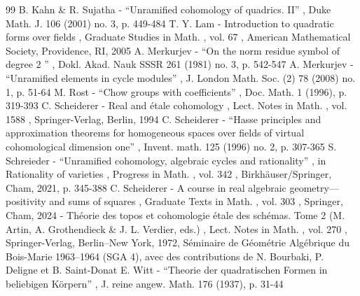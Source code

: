 \documentclass[11pt]{article}
\theoremstyle{definition}
\begin{document}
\begin{thebibliography}{99}
 B. Kahn \& R. Sujatha - “Unramified cohomology of quadrics. II” , Duke Math. J. 106 (2001) no. 3, p. 449-484
 T. Y. Lam - Introduction to quadratic forms over fields , Graduate Studies in Math. , vol. 67 , American Mathematical Society, Providence, RI, 2005
 A. Merkurjev - “On the norm residue symbol of degree $2$ ” , Dokl. Akad. Nauk SSSR 261 (1981) no. 3, p. 542-547
 A. Merkurjev - “Unramified elements in cycle modules” , J. London Math. Soc. (2) 78 (2008) no. 1, p. 51-64
 M. Rost - “Chow groups with coefficients” , Doc. Math. 1 (1996), p. 319-393
 C. Scheiderer - Real and étale cohomology , Lect. Notes in Math. , vol. 1588 , Springer-Verlag, Berlin, 1994
 C. Scheiderer - “Hasse principles and approximation theorems for homogeneous spaces over fields of virtual cohomological dimension one” , Invent. math. 125 (1996) no. 2, p. 307-365
 S. Schreieder - “Unramified cohomology, algebraic cycles and rationality” , in Rationality of varieties , Progress in Math. , vol. 342 , Birkhäuser/Springer, Cham, 2021, p. 345-388
 C. Scheiderer - A course in real algebraic geometry—positivity and sums of squares , Graduate Texts in Math. , vol. 303 , Springer, Cham, 2024
 - Théorie des topos et cohomologie étale des schémas. Tome 2 (M. Artin, A. Grothendieck \& J. L. Verdier, eds.) , Lect. Notes in Math. , vol. 270 , Springer-Verlag, Berlin–New York, 1972, Séminaire de Géométrie Algébrique du Bois-Marie 1963–1964 (SGA 4), avec des contributions de N. Bourbaki, P. Deligne et B. Saint-Donat
 E. Witt - “Theorie der quadratischen Formen in beliebigen Körpern” , J. reine angew. Math. 176 (1937), p. 31-44
\end{thebibliography}
\end{document}
